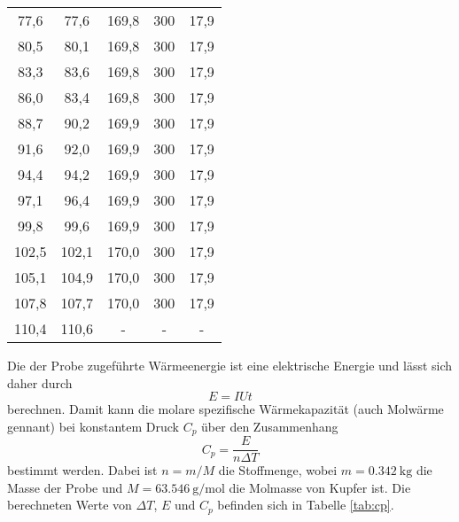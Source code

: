 \begin{table}[htp]
\begin{center}
\begin{tabular}{ccccc}
			77,6 & 77,6 & 169,8 & 300 & 17,9\\
			80,5 & 80,1 & 169,8 & 300 & 17,9\\
			83,3 & 83,6 & 169,8 & 300 & 17,9\\
			86,0 & 83,4 & 169,8 & 300 & 17,9\\
			88,7 & 90,2 & 169,9 & 300 & 17,9\\
			91,6 & 92,0 & 169,9 & 300 & 17,9\\
			94,4 & 94,2 & 169,9 & 300 & 17,9\\
			97,1 & 96,4 & 169,9 & 300 & 17,9\\
			99,8 & 99,6 & 169,9 & 300 & 17,9\\
			102,5 & 102,1 & 170,0 & 300 & 17,9\\
			105,1 & 104,9 & 170,0 & 300 & 17,9\\
			107,8 & 107,7 & 170,0 & 300 & 17,9\\
			110,4 & 110,6 & - & -& -\\
		\bottomrule
		\end{tabular}
	\end{center}
\end{table}

Die der Probe zugeführte Wärmeenergie ist eine elektrische Energie und lässt sich daher durch
\begin{equation*}
  E=IUt
\end{equation*}
berechnen. Damit kann die molare spezifische Wärmekapazität (auch Molwärme gennant) bei konstantem Druck $C_p$ über den Zusammenhang
\begin{equation*}
  C_p=\frac{E}{n \Delta T}
\end{equation*}
bestimmt werden. Dabei ist $n=m/M$ die Stoffmenge, wobei $m = \SI{0.342}{\kilo\gram}$ die
Masse der Probe und $M = \SI{63.546}{\gram\per\mole}$ \cite{Molmasse} die Molmasse von Kupfer ist.
Die berechneten Werte von $\Delta T$, $E$ und $C_p$ befinden sich in Tabelle \ref{tab:cp}.

